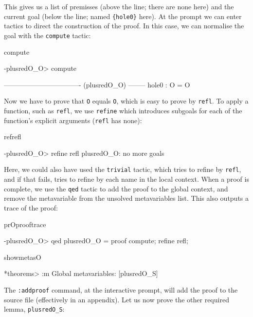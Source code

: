\noindent
This gives us a list of premisses 
(above the line; there are none here) and the current goal (below the line;
named \texttt{\{hole0\}} here).
At the prompt we can enter tactics to direct the construction of the proof. In this case,
we can normalise the goal with the \texttt{compute} tactic:

\begin{SaveVerbatim}{compute}

-plusredO_O> compute 

---------------------------------- (plusredO_O) --------
{hole0} : O = O

\end{SaveVerbatim}

\noindent
Now we have to prove that \texttt{O} equals \texttt{O}, which is easy to prove by
\texttt{refl}. To apply a function, such as \texttt{refl}, we use \texttt{refine} 
which introduces subgoals for each of the function's explicit arguments (\texttt{refl}
has none):

\begin{SaveVerbatim}{refrefl}

-plusredO_O> refine refl 
plusredO_O: no more goals

\end{SaveVerbatim}

\noindent
Here, we could also have used the \texttt{trivial} tactic, which tries to refine by
\texttt{refl}, and if that fails, tries to refine by each name in the local context.
When a proof is complete, we use the \texttt{qed} tactic to add the proof to the
global context, and remove the metavariable from the unsolved metavariables list.
This also outputs a trace of the proof:

\begin{SaveVerbatim}{prOprooftrace}

-plusredO_O> qed 
plusredO_O = proof {
    compute;
    refine refl;
}

\end{SaveVerbatim}

\begin{SaveVerbatim}{showmetasO}

*theorems> :m 
Global metavariables:
        [plusredO_S]

\end{SaveVerbatim}

\noindent
The \texttt{:addproof} command, at the interactive prompt, will add the proof to
the source file (effectively in an appendix).
Let us now prove the other required lemma, \texttt{plusredO\_S}:


